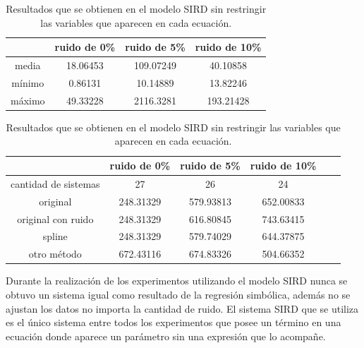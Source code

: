 \begin{table}[!h]
    \centering
    \caption{Resultados que se obtienen en el modelo SIRD sin restringir las variables que aparecen en cada ecuación.}
    \begin{tabular}{|c|c|c|c|}
        \hline
               & \textbf{ruido de 0\%} & \textbf{ruido de 5\%} & \textbf{ruido de 10\%} \\
        \hline
        media  & 18.06453              & 109.07249             & 40.10858               \\
        \hline
        mínimo & 0.86131               & 10.14889              & 13.82246               \\
        \hline
        máximo & 49.33228              & 2116.3281             & 193.21428              \\
        \hline
    \end{tabular}

    \begin{tabular}{|c|c|c|c|c|c|}
        \hline
                             & \textbf{ruido de 0\%} & \textbf{ruido de 5\%} & \textbf{ruido de 10\%} \\
        \hline
        cantidad de sistemas & 27                    & 26                    & 24                     \\
        \hline
        original             & 248.31329             & 579.93813             & 652.00833              \\
        \hline
        original con ruido   & 248.31329             & 616.80845             & 743.63415              \\
        \hline
        spline               & 248.31329             & 579.74029             & 644.37875              \\
        \hline
        otro método          & 672.43116             & 674.83326             & 504.66352              \\
        \hline
    \end{tabular}
    \label{table:experiment_SIRD_all}
\end{table}

Durante la realización de los experimentos utilizando el modelo SIRD nunca se obtuvo un sistema igual como resultado de la regresión simbólica, además no se ajustan los datos no importa la cantidad de ruido. El sistema SIRD que se utiliza es el único sistema entre todos los experimentos que posee un término en una ecuación donde aparece un parámetro sin una expresión que lo acompañe.

